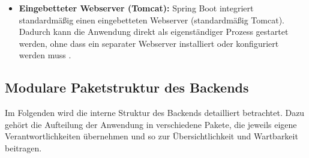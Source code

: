 \begin{itemize}
\item \textbf{Eingebetteter Webserver (Tomcat):} Spring Boot integriert standardmäßig einen eingebetteten Webserver (standardmäßig Tomcat). Dadurch kann die Anwendung direkt als eigenständiger Prozess gestartet werden, ohne dass ein separater Webserver installiert oder konfiguriert werden muss \cite{SPRINGBOOT2025b}.
\end{itemize}

\subsection{Modulare Paketstruktur des Backends}
Im Folgenden wird die interne Struktur des Backends detailliert betrachtet. Dazu gehört die Aufteilung der Anwendung in verschiedene Pakete, die jeweils eigene Verantwortlichkeiten übernehmen und so zur Übersichtlichkeit und Wartbarkeit beitragen.  

